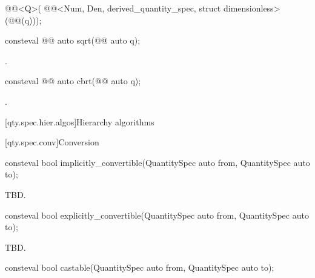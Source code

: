 \begin{itemdescr}
\pnum
\returns
\begin{codeblock}
@@<Q{}>(
  @@<Num, Den, derived_quantity_spec, struct dimensionless>(@@(q)));
\end{codeblock}
\end{itemdescr}

\begin{itemdecl}
consteval @@ auto sqrt(@@ auto q);
\end{itemdecl}

\begin{itemdescr}
\pnum
\returns
{}.
\end{itemdescr}

\begin{itemdecl}
consteval @@ auto cbrt(@@ auto q);
\end{itemdecl}

\begin{itemdescr}
\pnum
\returns
{}.
\end{itemdescr}

[qty.spec.hier.algos]{Hierarchy algorithms}

[qty.spec.conv]{Conversion}

\begin{itemdecl}
consteval bool implicitly_convertible(QuantitySpec auto from, QuantitySpec auto to);
\end{itemdecl}

\begin{itemdescr}
\pnum
\returns
TBD.
\end{itemdescr}

\begin{itemdecl}
consteval bool explicitly_convertible(QuantitySpec auto from, QuantitySpec auto to);
\end{itemdecl}

\begin{itemdescr}
\pnum
\returns
TBD.
\end{itemdescr}

\begin{itemdecl}
consteval bool castable(QuantitySpec auto from, QuantitySpec auto to);
\end{itemdecl}

